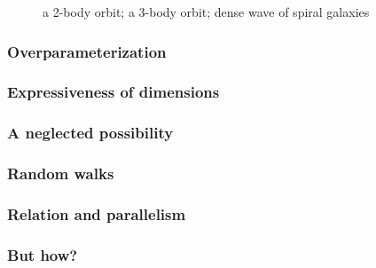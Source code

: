 \documentclass[aspectratio=169]{beamer}
\begin{document}
\begin{frame}
\begin{figure}[ht]
\caption{a 2-body orbit; a 3-body orbit; dense wave of spiral galaxies}
\end{figure}
\end{frame}

\begin{frame}
\frametitle{Overparameterization}
\end{frame}

\begin{frame}
\frametitle{Expressiveness of dimensions}

\end{frame}

\begin{frame}
\frametitle{A neglected possibility}
\end{frame}

\begin{frame}
\frametitle{Random walks}
\end{frame}

\begin{frame}
\frametitle{Relation and parallelism}
\end{frame}

\begin{frame}
\frametitle{But how?}
\end{frame}
\end{document}
